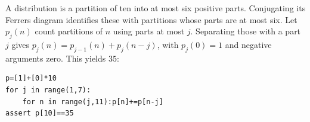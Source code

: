 A distribution is a partition of ten into at most six positive parts. Conjugating its Ferrers diagram identifies these with partitions whose parts are at most six. Let $ p_j(n)$ count partitions of $ n $ using parts at most $ j $. Separating those with a part $ j $ gives $ p_j(n)=p_{j-1}(n)+p_j(n-j)$, with $ p_j(0)=1 $ and negative arguments zero. This yields $\boxed{35}$:
\begin{verbatim}
p=[1]+[0]*10
for j in range(1,7):
    for n in range(j,11):p[n]+=p[n-j]
assert p[10]==35
\end{verbatim}
